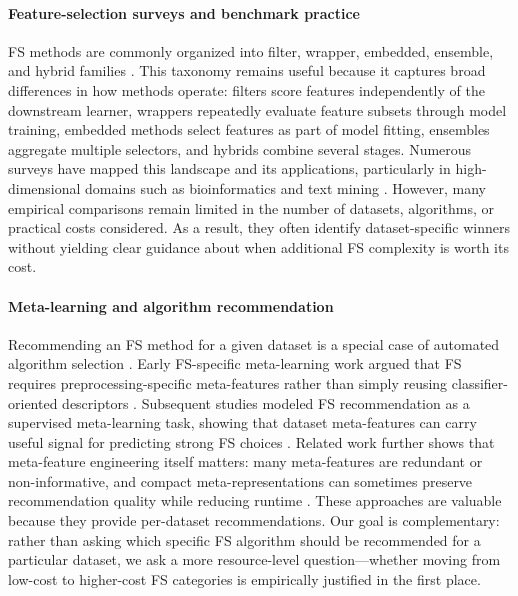 \documentclass[preprint,12pt,authoryear]{elsarticle}
\begin{document}
{\paragraph{Feature-selection surveys and benchmark practice}
FS methods are commonly organized into filter, wrapper, embedded, ensemble, and hybrid families \citep{Saeys2007Review}. This taxonomy remains useful because it captures broad differences in how methods operate: filters score features independently of the downstream learner, wrappers repeatedly evaluate feature subsets through model training, embedded methods select features as part of model fitting, ensembles aggregate multiple selectors, and hybrids combine several stages. Numerous surveys have mapped this landscape and its applications, particularly in high-dimensional domains such as bioinformatics and text mining \citep{weston2000feature,guyon2003introduction,chandrashekar2014survey,bolon2014review,li2017feature,bommert2020benchmark,bommert2022benchmark,jiao2023survey}. However, many empirical comparisons remain limited in the number of datasets, algorithms, or practical costs considered. As a result, they often identify dataset-specific winners without yielding clear guidance about when additional FS complexity is worth its cost.

\paragraph{Meta-learning and algorithm recommendation}
Recommending an FS method for a given dataset is a special case of automated algorithm selection \citep{kerschke2019automated}. Early FS-specific meta-learning work argued that FS requires preprocessing-specific meta-features rather than simply reusing classifier-oriented descriptors \citep{filchenkov2015datasets}. Subsequent studies modeled FS recommendation as a supervised meta-learning task, showing that dataset meta-features can carry useful signal for predicting strong FS choices \citep{PARMEZAN20171,auto_recommend_fs_2021}. Related work further shows that meta-feature engineering itself matters: many meta-features are redundant or non-informative, and compact meta-representations can sometimes preserve recommendation quality while reducing runtime \citep{meta_feature_selection_arxiv2021,explain_meta_features_2023}. These approaches are valuable because they provide per-dataset recommendations. Our goal is complementary: rather than asking which specific FS algorithm should be recommended for a particular dataset, we ask a more resource-level question---whether moving from low-cost to higher-cost FS categories is empirically justified in the first place.

}
\end{document}
